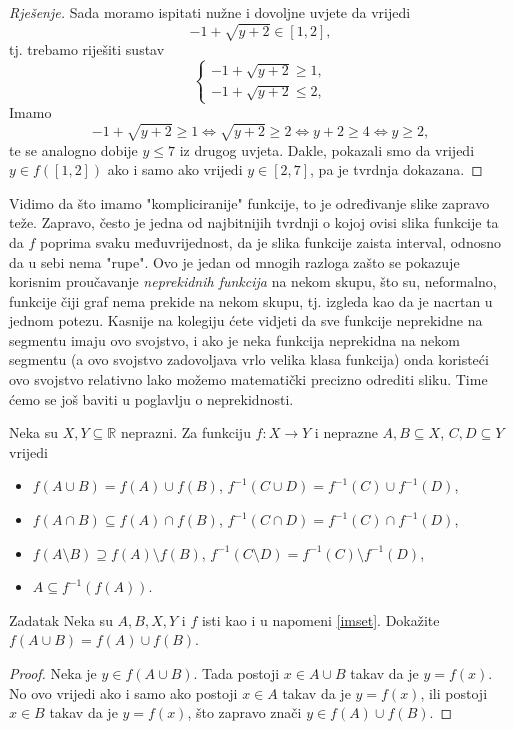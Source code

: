 \begin{proof}[Rješenje]
Sada moramo ispitati nužne i dovoljne uvjete da vrijedi \[-1+\sqrt{y+2}\in [1, 2],\]
tj. trebamo riješiti sustav
\[\begin{cases}
-1+\sqrt{y+2}\geq 1,\\
-1+\sqrt{y+2}\leq 2,
\end{cases}\]
Imamo
\[-1+\sqrt{y+2}\geq 1\Leftrightarrow \sqrt{y+2}\geq 2\Leftrightarrow y+2\geq 4\Leftrightarrow y\geq 2,\]
te se analogno dobije \(y\leq 7\) iz drugog uvjeta. Dakle, pokazali smo da vrijedi \(y\in f([1, 2])\) ako i samo ako vrijedi \(y\in [2, 7]\), pa je tvrdnja dokazana.
\end{proof}
\begin{remark}
Vidimo da što imamo "kompliciranije" funkcije, to je određivanje slike zapravo teže. Zapravo, često je jedna od najbitnijih tvrdnji o kojoj ovisi slika funkcije ta da \(f\) poprima svaku međuvrijednost, da je slika funkcije zaista interval, odnosno da u sebi nema "rupe". Ovo je jedan od mnogih razloga zašto se pokazuje korisnim proučavanje \textit{neprekidnih funkcija} na nekom skupu, što su, neformalno, funkcije čiji graf nema prekide na nekom skupu, tj. izgleda kao da je nacrtan u jednom potezu. Kasnije na kolegiju ćete vidjeti da sve funkcije neprekidne na segmentu imaju ovo svojstvo, i ako je neka funkcija neprekidna na nekom segmentu (a ovo svojstvo zadovoljava vrlo velika klasa funkcija) onda koristeći ovo svojstvo relativno lako možemo matematički precizno odrediti sliku. Time ćemo se još baviti u poglavlju o neprekidnosti.
\end{remark}
\begin{remark}
\label{imset}
Neka su \(X,Y\subseteq \mathbb{R}\) neprazni. Za funkciju \(f : X\to Y\) i neprazne \(A, B\subseteq X\), \(C, D\subseteq Y\) vrijedi
\begin{itemize}
\item \(f(A\cup B)=f(A)\cup f(B)\), \hspace{0.5cm} \(f^{-1}(C\cup D)=f^{-1}(C)\cup f^{-1}(D)\),
\item \(f(A\cap B)\subseteq f(A)\cap f(B)\), \hspace{0.5cm} \(f^{-1}(C\cap D)=f^{-1}(C)\cap f^{-1}(D)\),
\item \(f\left(A\setminus B\right)\supseteq f(A)\setminus f(B)\), \hspace{0.5cm} \(f^{-1}\left(C\setminus D\right)=f^{-1}(C)\setminus f^{-1}(D)\),
\item \(A\subseteq f^{-1}(f(A))\).
\end{itemize}
\end{remark}
\begin{exercise}{Zadatak}
Neka su \(A, B, X, Y\) i \(f\) isti kao i u napomeni \ref{imset}. Dokažite \(f(A\cup B)=f(A)\cup f(B)\).
\end{exercise}
\begin{proof}
Neka je \(y\in f(A\cup B)\). Tada postoji \(x\in A\cup B\) takav da je \(y=f(x)\). No ovo vrijedi ako i samo ako postoji \(x\in A\) takav da je \(y=f(x)\), ili postoji \(x\in B\) takav da je \(y=f(x)\), što zapravo znači \(y\in f(A)\cup f(B)\).
\end{proof}
